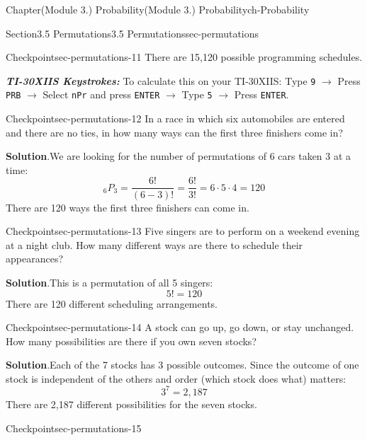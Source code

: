 \documentclass[oneside,10pt,]{book}
\newcommand{\blocktitlefont}{\relax}
\newcommand{\mono}[1]{\texttt{#1}}
\newcommand{\alert}[1]{\textbf{\textit{#1}}}
\begin{document}
\begin{chapterptx}{Chapter}{(Module 3.) Probability}{}{(Module 3.) Probability}{}{}{ch-Probability}
\begin{sectionptx}{Section}{3.5 Permutations}{}{3.5 Permutations}{}{}{sec-permutations}
\begin{inlineexercise}{Checkpoint}{}{sec-permutations-11}
There are 15,120 possible programming schedules.%
\par
\alert{TI-30XIIS Keystrokes:} To calculate this on your TI-30XIIS: Type \mono{9} \(\rightarrow\) Press \mono{PRB} \(\rightarrow\) Select \mono{nPr} and press \mono{ENTER} \(\rightarrow\) Type \mono{5} \(\rightarrow\) Press \mono{ENTER}.%
\end{inlineexercise}%
\begin{inlineexercise}{Checkpoint}{}{sec-permutations-12}%
In a race in which six automobiles are entered and there are no ties, in how many ways can the first three finishers come in?%
\par\smallskip%
\noindent\textbf{\blocktitlefont Solution}.\hypertarget{sec-permutations-12-2}{}\quad{}We are looking for the number of permutations of 6 cars taken 3 at a time:%
\begin{equation*}
{}_6 P_3 = \frac{6!}{(6-3)!} = \frac{6!}{3!} = 6 \cdot 5 \cdot 4 = 120
\end{equation*}
There are 120 ways the first three finishers can come in.%
\end{inlineexercise}%
\begin{inlineexercise}{Checkpoint}{}{sec-permutations-13}%
Five singers are to perform on a weekend evening at a night club. How many different ways are there to schedule their appearances?%
\par\smallskip%
\noindent\textbf{\blocktitlefont Solution}.\hypertarget{sec-permutations-13-2}{}\quad{}This is a permutation of all 5 singers:%
\begin{equation*}
5! = 120
\end{equation*}
There are 120 different scheduling arrangements.%
\end{inlineexercise}%
\begin{inlineexercise}{Checkpoint}{}{sec-permutations-14}%
A stock can go up, go down, or stay unchanged. How many possibilities are there if you own seven stocks?%
\par\smallskip%
\noindent\textbf{\blocktitlefont Solution}.\hypertarget{sec-permutations-14-2}{}\quad{}Each of the 7 stocks has 3 possible outcomes. Since the outcome of one stock is independent of the others and order (which stock does what) matters:%
\begin{equation*}
3^7 = 2,187
\end{equation*}
There are 2,187 different possibilities for the seven stocks.%
\end{inlineexercise}%
\begin{inlineexercise}{Checkpoint}{}{sec-permutations-15}%

\end{inlineexercise}
\end{sectionptx}
\end{chapterptx}
\end{document}
